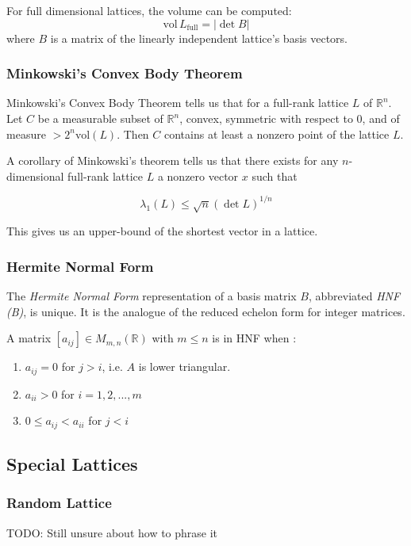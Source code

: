 \documentclass[10pt]{article}
\begin{document}
For full dimensional lattices, the volume can be computed:
\[
\text{vol} \,L_{\text{full}} = |\det B|
\] where $B$ is a matrix of the linearly independent lattice's basis vectors.


\subsubsection{Minkowski's Convex Body Theorem}

Minkowski's Convex Body Theorem tells us that for a full-rank lattice $L$ of $\mathbb{R}^n$. Let $C$ be a measurable subset of $\mathbb{R}^n$, convex, symmetric with respect to 0, and of measure $> 2^n \text{vol}(L)$. Then $C$ contains at least a nonzero point of the lattice $L$.

A corollary of Minkowski's theorem tells us that there exists for any $n$-dimensional full-rank lattice $L$ a nonzero vector $x$ such that

\[
\lambda_1(L) \leq \sqrt{n} (\det L)^{1/n}
\]

This gives us an upper-bound of the shortest vector in a lattice.

\subsubsection{Hermite Normal Form}

The \emph{Hermite Normal Form} representation of a basis matrix $B$, abbreviated \emph{HNF (B)}, is unique. It is the analogue of the reduced echelon form for integer matrices.

A matrix $[a_{ij}] \in M_{m,n} (\mathbb{R})$ with $m \leq n$ is in HNF when\cite{SchnorrStanfordNotes} :
\begin{enumerate}
\item $a_{ij} = 0$ for $j > i$, i.e. $A$ is lower triangular. 
\item $a_{ii} > 0$ for $i=1,2,...,m$
\item $0 \leq a_{ij} < a_{ii}$ for $j < i$
\end{enumerate}

\subsection{Special Lattices}

\subsubsection{Random Lattice}
TODO: Still unsure about how to phrase it
\end{document}
